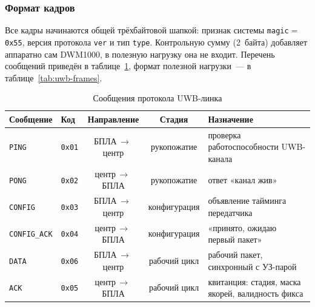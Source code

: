 \documentclass[a4paper,11pt]{article} %
\begin{document}
\subsubsection{Формат кадров}

Все кадры начинаются общей трёхбайтовой шапкой: признак системы
\texttt{magic}${=}$\texttt{0x55}, версия протокола \texttt{ver} и тип \texttt{type}.
Контрольную сумму (2~байта) добавляет аппаратно сам DWM1000, в полезную нагрузку
она не входит. Перечень сообщений приведён в таблице~\ref{tab:uwb-msgs}, формат
полезной нагрузки~--- в таблице~\ref{tab:uwb-frames}.

\begin{table}[h!]
\centering
\caption{Сообщения протокола UWB-линка}
\label{tab:uwb-msgs}
\small
\begin{tabular}{@{}llccp{5.9cm}@{}}
\toprule
Сообщение & Код & Направление & Стадия & Назначение \\ \midrule
\texttt{PING}        & \texttt{0x01} & БПЛА\,$\to$\,центр & рукопожатие  & проверка работоспособности UWB-канала \\
\texttt{PONG}        & \texttt{0x02} & центр\,$\to$\,БПЛА & рукопожатие  & ответ «канал жив» \\
\texttt{CONFIG}      & \texttt{0x03} & БПЛА\,$\to$\,центр & конфигурация & объявление тайминга передатчика \\
\texttt{CONFIG\_ACK} & \texttt{0x04} & центр\,$\to$\,БПЛА & конфигурация & «принято, ожидаю первый пакет» \\
\texttt{DATA}        & \texttt{0x06} & БПЛА\,$\to$\,центр & рабочий цикл & рабочий пакет, синхронный с УЗ-парой \\
\texttt{ACK}         & \texttt{0x05} & центр\,$\to$\,БПЛА & рабочий цикл & квитанция: стадия, маска якорей, валидность фикса \\
\bottomrule
\end{tabular}
\end{table}
\end{document}
